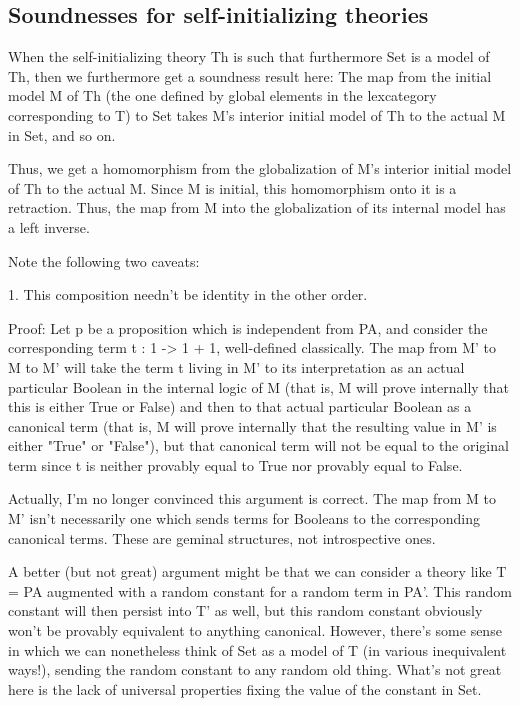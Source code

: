 \subsection{Soundnesses for self-initializing theories}
\begin{TODOblock}
When the self-initializing theory Th is such that furthermore Set is a model of Th, then we furthermore get a soundness result here: The map from the initial model M of Th (the one defined by global elements in the lexcategory corresponding to T) to Set takes M's interior initial model of Th to the actual M in Set, and so on.

Thus, we get a homomorphism from the globalization of M's interior initial model of Th to the actual M. Since M is initial, this homomorphism onto it is a retraction. Thus, the map from M into the globalization of its internal model has a left inverse.

Note the following two caveats:

1. This composition needn't be identity in the other order.

Proof: Let p be a proposition which is independent from PA, and consider the corresponding term t : 1 -> 1 + 1, well-defined classically. The map from M' to M to M' will take the term t living in M' to its interpretation as an actual particular Boolean in the internal logic of M (that is, M will prove internally that this is either True or False) and then to that actual particular Boolean as a canonical term (that is, M will prove internally that the resulting value in M' is either "True" or "False"), but that canonical term will not be equal to the original term since t is neither provably equal to True nor provably equal to False.

Actually, I'm no longer convinced this argument is correct. The map from M to M' isn't necessarily one which sends terms for Booleans to the corresponding canonical terms. These are geminal structures, not introspective ones.

A better (but not great) argument might be that we can consider a theory like T = PA augmented with a random constant for a random term in PA'. This random constant will then persist into T' as well, but this random constant obviously won't be provably equivalent to anything canonical. However, there's some sense in which we can nonetheless think of Set as a model of T (in various inequivalent ways!), sending the random constant to any random old thing. What's not great here is the lack of universal properties fixing the value of the constant in Set.


\end{TODOblock}
